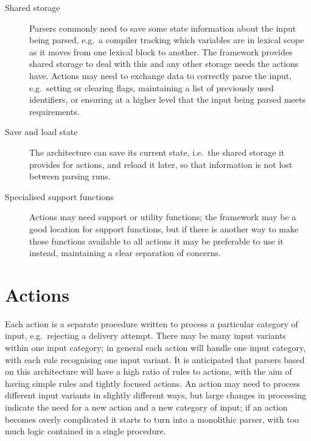 \begin{description}
    \item [Shared storage]  Parsers commonly need to save some state
        information about the input being parsed, e.g.\ a compiler tracking
        which variables are in lexical scope as it moves from one lexical
        block to another.  The framework provides shared storage to deal
        with this and any other storage needs the actions have.  Actions
        may need to exchange data to correctly parse the input, e.g.\
        setting or clearing flags, maintaining a list of previously used
        identifiers, or ensuring at a higher level that the input being
        parsed meets requirements.

    \item [Save and load state]  The architecture can save its current
        state, i.e.\ the shared storage it provides for actions, and reload
        it later, so that information is not lost between parsing runs.

    \item [Specialised support functions]  Actions may need support or
        utility functions; the framework may be a good location for support
        functions, but if there is another way to make those functions
        available to all actions it may be preferable to use it instead,
        maintaining a clear separation of concerns.

\end{description}

\section{Actions}

\label{actions in architecture}

Each action is a separate procedure written to process a particular
category of input, e.g.\ rejecting a delivery attempt.  There may be many
input variants within one input category; in general each action will
handle one input category, with each rule recognising one input variant.
It is anticipated that parsers based on this architecture will have a high
ratio of rules to actions, with the aim of having simple rules and tightly
focused actions.  An action may need to process different input variants in
slightly different ways, but large changes in processing indicate the need
for a new action and a new category of input; if an action becomes overly
complicated it starts to turn into a monolithic parser, with too much logic
contained in a single procedure.

